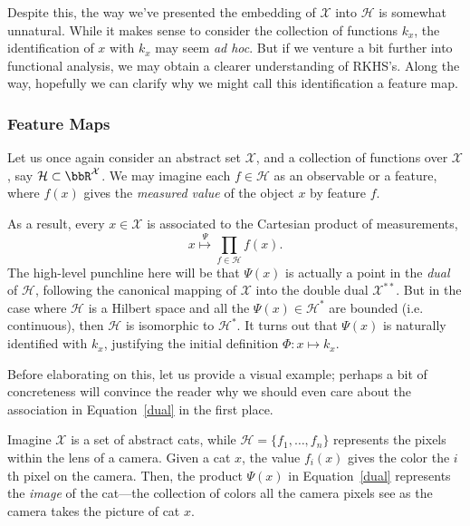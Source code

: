 \documentclass[twoside,11pt]{homework}
\begin{document}
\begin{multicols}{2}
Despite this, the way we've presented the embedding of $\mathcal{X}$ into $\mathcal{H}$ is somewhat unnatural. While it makes sense to consider the collection of functions $k_x$, the identification of $x$ with $k_x$ may seem \emph{ad hoc}. But if we venture a bit further into functional analysis, we may obtain a clearer understanding of RKHS's. Along the way, hopefully we can clarify why we might call this identification a feature map.

\subsubsection{Feature Maps}
Let us once again consider an abstract set $\mathcal{X}$, and a collection of functions over $\mathcal{X}$, say $\mathcal{H} \subset \bbR^\mathcal{X}$. We may imagine each $f \in \mathcal{H}$ as an observable or a feature, where $f(x)$ gives the \emph{measured value} of the object $x$ by feature $f$.

As a result, every $x \in \mathcal{X}$ is associated to the Cartesian product of measurements,
\begin{equation}\label{dual}
  x \overset{\Psi}{\mapsto}\prod_{f \in \mathcal{H}} f(x).
\end{equation}
The high-level punchline here will be that $\Psi(x)$ is actually a point in the \emph{dual} of $\mathcal{H}$, following the canonical mapping of $\mathcal{X}$ into the double dual $\mathcal{X}^{**}$. But in the case where $\mathcal{H}$ is a Hilbert space and all the $\Psi(x) \in \mathcal{H}^*$ are bounded (i.e. continuous), then $\mathcal{H}$ is isomorphic to $\mathcal{H}^*$. It turns out that $\Psi(x)$ is naturally identified with $k_x$, justifying the initial definition $\Phi : x \mapsto k_x$.

Before elaborating on this, let us provide a visual example; perhaps a bit of concreteness will convince the reader why we should even care about the association in Equation~\ref{dual} in the first place.

Imagine $\mathcal{X}$ is a set of abstract cats, while $\mathcal{H} = \{f_1,\dotsc, f_n\}$ represents the pixels within the lens of a camera. Given a cat $x$, the value $f_i(x)$ gives the color the $i$th pixel on the camera. Then, the product $\Psi(x)$ in Equation~\ref{dual} represents the \emph{image} of the cat---the collection of colors all the camera pixels see as the camera takes the picture of cat $x$.


\end{multicols}
\end{document}
